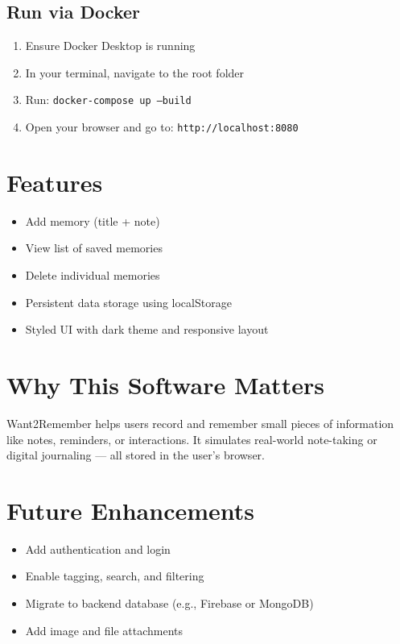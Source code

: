 \documentclass[12pt]{article}
\begin{document}
\subsection*{Run via Docker}
\begin{enumerate}
  \item Ensure Docker Desktop is running
  \item In your terminal, navigate to the root folder
  \item Run: \texttt{docker-compose up --build}
  \item Open your browser and go to: \texttt{http://localhost:8080}
\end{enumerate}

\section{Features}
\begin{itemize}
  \item Add memory (title + note)
  \item View list of saved memories
  \item Delete individual memories
  \item Persistent data storage using localStorage
  \item Styled UI with dark theme and responsive layout
\end{itemize}

\section{Why This Software Matters}
Want2Remember helps users record and remember small pieces of information like notes, reminders, or interactions. It simulates real-world note-taking or digital journaling — all stored in the user's browser.

\section{Future Enhancements}
\begin{itemize}
  \item Add authentication and login
  \item Enable tagging, search, and filtering
  \item Migrate to backend database (e.g., Firebase or MongoDB)
  \item Add image and file attachments
\end{itemize}
\end{document}
